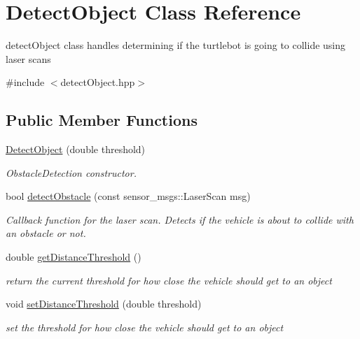 \hypertarget{class_detect_object}{}\section{Detect\+Object Class Reference}
\label{class_detect_object}


detect\+Object class handles determining if the turtlebot is going to collide using laser scans  




{\ttfamily \#include $<$detect\+Object.\+hpp$>$}

\subsection*{Public Member Functions}
\begin{DoxyCompactItemize}
\item 
\hyperlink{class_detect_object_acf8a913ce125f42a8adb0570af9899ec}{Detect\+Object} (double threshold)
\begin{DoxyCompactList}\small\item\em Obstacle\+Detection constructor. \end{DoxyCompactList}\item 
bool \hyperlink{class_detect_object_aeb729c9a9152c6814558abbf48672d49}{detect\+Obstacle} (const sensor\+\_\+msgs\+::\+Laser\+Scan msg)
\begin{DoxyCompactList}\small\item\em Callback function for the laser scan. Detects if the vehicle is about to collide with an obstacle or not. \end{DoxyCompactList}\item 
double \hyperlink{class_detect_object_a1f0077f9c5a397235088c405714057db}{get\+Distance\+Threshold} ()
\begin{DoxyCompactList}\small\item\em return the current threshold for how close the vehicle should get to an object \end{DoxyCompactList}\item 
void \hyperlink{class_detect_object_afa178e1d0839f02a395bdc2e0fa55a65}{set\+Distance\+Threshold} (double threshold)
\begin{DoxyCompactList}\small\item\em set the threshold for how close the vehicle should get to an object \end{DoxyCompactList}\end{DoxyCompactItemize}


